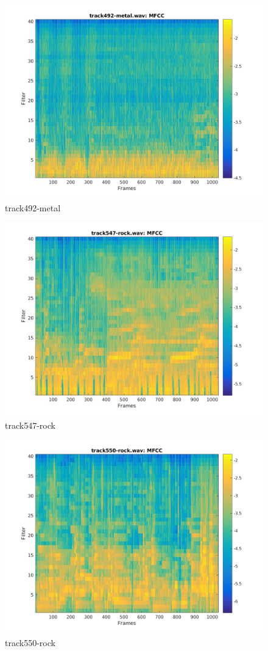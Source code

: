 \documentclass[11pt, a4paper]{article}
\begin{document}
\begin{figure}[H]
    \centering
    \includegraphics[width=.8\textwidth]{track492-metal-mfcc.png}
    \caption{track492-metal}
\end{figure}


\begin{figure}[H]
    \centering
    \includegraphics[width=.8\textwidth]{track547-rock-mfcc.png}
    \caption{track547-rock}
\end{figure}


\begin{figure}[H]
    \centering
    \includegraphics[width=.8\textwidth]{track550-rock-mfcc.png}
    \caption{track550-rock}
\end{figure}
\end{document}

